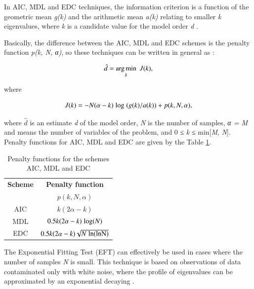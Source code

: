 \documentclass[review]{elsarticle}
\DeclareMathOperator*{\argmin}{arg\,min}
\begin{document}
In AIC, MDL and EDC techniques, the information criterion is a function of the geometric mean \emph{g(k)} and the arithmetic mean \emph{a(k)} relating to smaller \emph{k} eigenvalues, where \emph{k} is a candidate value for the model order \emph{d} \cite{da2009comparison}.

Basically, the difference between the AIC, MDL and EDC schemes is the penalty function \emph{p(k, N, α)}, so these techniques can be written in general as \cite{da2009comparison}:

\begin{equation}\label{eq:eq1}
\hat{d} = \argmin\limits_k \hspace{1 mm} J(k), 
\end{equation}

where

\begin{equation}\label{eq:eq2}
J(k) = -N(\alpha - k) \hspace{1 mm} {\rm log} \hspace{1 mm} (g(k)/a(k)) + p(k,N,\alpha),
\end{equation}

where $\hat{d}$ is an estimate \emph{d} of the model order, \emph{N} is the number of samples, \emph{α = M} and means the number of variables of the problem, and 0 ≤ \emph{k} ≤ min[\emph{M}, \emph{N}]. Penalty functions for AIC, MDL and EDC are given by the Table \ref{tab:tab2}.

\begin{table}[h!]
  \centering
  \caption{Penalty functions for the schemes AIC, MDL and EDC}
  \label{tab:tab2}
  \begin{tabular}{*2c}
	\toprule
	\textbf{Scheme} &  \textbf{Penalty function} \\
	\textbf{} &  $p(k,N,\alpha)$ \\
	\midrule
    AIC	& $k(2\alpha - k)$ \\
    MDL	& $0.5k(2\alpha - k) \hspace{1 mm} {\rm log} (N)$ \\
    EDC	& $0.5k(2\alpha - k)\sqrt{N\hspace{1 mm}\rm ln(\rm ln N)}$ \\
    \bottomrule
  \end{tabular}
\end{table}

The Exponential Fitting Test (EFT) can effectively be used in cases where the number of samples \emph{N} is small. This technique is based on observations of data contaminated only with white noise, where the profile of eigenvalues can be approximated by an exponential decaying \cite{grouffaud1996some}.
\end{document}
